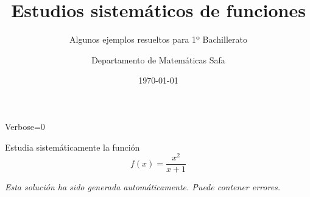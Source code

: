 \documentclass[nochap,palatino,nobuilddate]{estudioFuncion}
\title{Estudios sistemáticos de funciones}
\author{Departamento de Matemáticas Safa}
\date{\today}
\subtitle{Algunos ejemplos resueltos para 1º Bachillerato}
\newif\ifverbose
\begin{document}

\ifverbose
	\begin{sagesilent}
		Verbose=1
	\end{sagesilent}
\else
	\begin{sagesilent}
		Verbose=0
	\end{sagesilent}
\fi


\maketitle




\begin{problem} Estudia sistemáticamente la función
	\[
		f(x)=\frac{x^2}{x+1}
	\]
\solution

\textit{Esta solución ha sido generada automáticamente. Puede contener errores.}


\end{problem}
















\end{document}

